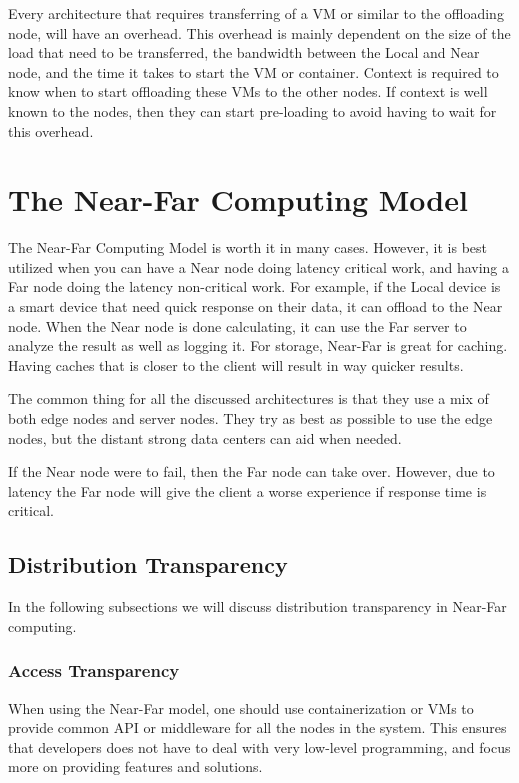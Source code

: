 Every architecture that requires transferring of a VM or similar to the offloading node, will have an overhead. This overhead is mainly dependent on the size of the load that need to be transferred, the bandwidth between the Local and Near node, and the time it takes to start the VM or container. Context is required to know when to start offloading these VMs to the other nodes. If context is well known to the nodes, then they can start pre-loading to avoid having to wait for this overhead.







\section{The Near-Far Computing Model}
The Near-Far Computing Model is worth it in many cases. However, it is best utilized when you can have a Near node doing latency critical work, and having a Far node doing the latency non-critical work. For example, if the Local device is a smart device that need quick response on their data, it can offload to the Near node. When the Near node is done calculating, it can use the Far server to analyze the result as well as logging it. For storage, Near-Far is great for caching. Having caches that is closer to the client will result in way quicker results.

The common thing for all the discussed architectures is that they use a mix of both edge nodes and server nodes. They try as best as possible to use the edge nodes, but the distant strong data centers can aid when needed. 

If the Near node were to fail, then the Far node can take over. However, due to latency the Far node will give the client a worse experience if response time is critical. 

\subsection{Distribution Transparency}
In the following subsections we will discuss distribution transparency in Near-Far computing.

\subsubsection{Access Transparency}
When using the Near-Far model, one should use containerization or VMs to provide common API or middleware for all the nodes in the system. This ensures that developers does not have to deal with very low-level programming, and focus more on providing features and solutions.

